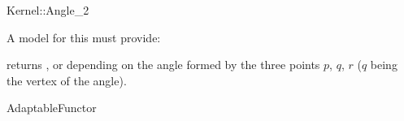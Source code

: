 \begin{ccRefFunctionObjectConcept}{Kernel::Angle_2}


A model for this must provide:


{returns ,  or  depending
on the angle formed by the three points $p$, $q$, $r$ ($q$ being the vertex of
the angle).}

\ccRefines
AdaptableFunctor

\ccSeeAlso
{}  \\

\end{ccRefFunctionObjectConcept}
